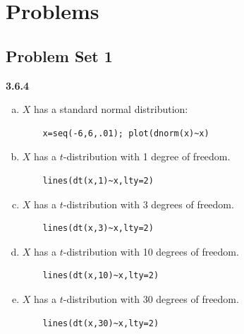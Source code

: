 \documentclass{book}
\theoremstyle{definition}
\begin{document}
\newpage


\chapter{Problems}


\newpage

\section{Problem Set 1}

\noindent \textbf{3.6.4}
\begin{enumerate}[(a)]
	\item $X$ has a standard normal distribution:
	\begin{lstlisting}
	x=seq(-6,6,.01); plot(dnorm(x)~x)
	\end{lstlisting}
	\item $X$ has a $t$-distribution with 1 degree of freedom.
	\begin{lstlisting}
	lines(dt(x,1)~x,lty=2)
	\end{lstlisting}
	\item $X$ has a $t$-distribution with 3 degrees of freedom.
	\begin{lstlisting}
	lines(dt(x,3)~x,lty=2)
	\end{lstlisting}
	\item $X$ has a $t$-distribution with 10 degrees of freedom.
	\begin{lstlisting}
	lines(dt(x,10)~x,lty=2)
	\end{lstlisting}
	\item $X$ has a $t$-distribution with 30 degrees of freedom.
	\begin{lstlisting}
	lines(dt(x,30)~x,lty=2)
	\end{lstlisting}
\end{enumerate}
\end{document}

